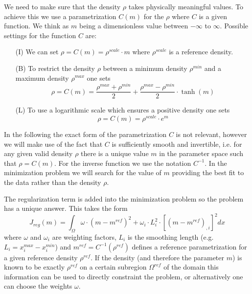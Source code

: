 We need to make sure that the density $\rho$ takes physically meaningful values. 
To achieve this we use a parametrization $C(m)$ for the $\rho$ where $C$ is a given function. We think as 
$m$ being a dimensionless value between $-\infty$ to $\infty$. Possible settings for the function $C$ are:
\begin{itemize}
 \item[(I)] We can set $\rho = C(m)= \rho^{scale} \cdot m$ where $\rho^{scale}$ is a reference density.
 \item[(B)] To restrict the density $\rho$ between 
a minimum density $\rho^{min}$ and a maximum density $\rho^{max}$ one sets 
\begin{equation} 
\rho = C(m) = \frac{\rho^{max} +\rho^{min}}{2} + \frac{\rho^{max} -\rho^{min}}{2} \cdot \tanh(m)
\end{equation} 
 \item[(L)] To use a logarithmic scale which ensures a positive density one sets
\begin{equation} 
\rho = C(m) = \rho^{scale} \cdot e^{m}
\end{equation} 
\end{itemize}
In the following the exact form of the parametrization $C$ is not relevant, however we will make use of the 
fact that $C$ is sufficiently smooth and invertible, i.e. for any given valid density $\rho$ there is a unique
 value $m$ in the parameter space such that $\rho=C(m)$. For the inverse function we use the notation $C^{-1}$.
In the minimization problem we will search for the value of $m$ providing the best fit to the data 
rather than the density $\rho$. 


The regularization term is added into the minimization problem so the problem has a unique answer. This
takes the form 
\begin{equation}\label{GRAV:EQU:104}
J_{reg}(m) =  \int_{\Omega} \omega \cdot (m-m^{ref})^2 + \omega_i \cdot L_i^2 \cdot [ (m -m^{ref})_{,i}] ^2 dx
\end{equation} 
where $\omega$ and $\omega_i$ are weighting factors, $L_i$ is the smoothing length (e.g. $L_i= x^{max}_i-x^{min}_i$)
and $m^{ref}=C^{-1}(\rho^{ref})$ defines a reference parametrization for a given reference 
density $\rho^{ref}$. 
If the density (and therefore the parameter $m$) is known to be exactly $\rho^{ref}$ on a certain subregion $\Omega^{ref}$ of
the domain this information can be used
to directly constraint the problem, or alternatively one can choose the weights $\omega$. 

